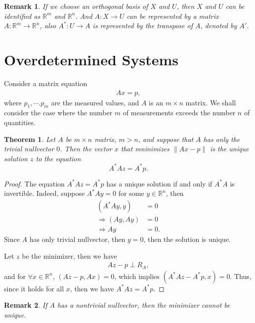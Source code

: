 \documentclass[11pt]{book}
\newtheorem{theorem}{Theorem}[section]
\newtheorem{remark}{Remark}[section]
\theoremstyle{definition}
\numberwithin{equation}{subsection}
\begin{document}
\begin{remark}
If we choose an orthogonal basis of $X$ and $U$, then $X$ and $U$ can be identified as $\mathbb{R}^m$ and $\mathbb{R}^n$. And $A:X\to U$ can be represented by a matrix $A:\mathbb{R}^m\to \mathbb{R}^n$, also $A^*:U\to A$ is represented by the transpose of $A$, denoted by $A'$.
\end{remark}

\section{Overdetermined Systems}

Consider a matrix equation
\begin{align*}
    Ax = p,
\end{align*}
where $p_1,\cdots.p_m$ are the measured values, and $A$ is an $m\times n$ matrix. We shall
consider the case where the number $m$ of measurements exceeds the number $n$ of quantities. 

\medskip

\begin{theorem}
Let $A$ be $m\times n$ matrix, $m > n$, and suppose that $A$ has only the trivial nullvector $0$. Then the vector $x$ that mninimizes $\|Ax - p\|$ is the unique solution $z$ to the equation
$$A^* A z = A^* p.$$
\end{theorem}
\begin{proof}
The equation $A^* A z = A^* p$ has a unique solution if and only if $A^* A$ is invertible. Indeed, suppose $A^* Ay = 0$ for some $y \in \mathbb{R}^n$, then 
\begin{align*}
    (A^* A y, y) & = 0 \\
    \Rightarrow (Ay, Ay) & = 0 \\
    \Rightarrow Ay & = 0.
\end{align*}
Since $A$ has only trivial nullvector, then $y = 0$, then the solution is unique.

Let $z$ be the minimizer, then we have
\begin{align*}
    Az - p \perp R_A,
\end{align*}
and for $\forall x\in\mathbb{R}^n$, $(Az - p, Ax) = 0$, which implies $(A^*Az - A^*p, x) = 0$. Thus, since it holds for all $x$, then we have $A^*Az = A^*p$.
\end{proof}

\begin{remark}
If $A$ has a nontrivial nullvector, then the minimizer cannot be unique.
\end{remark}
\end{document}
